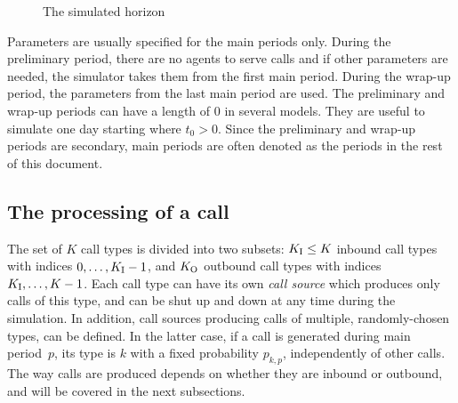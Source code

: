 \begin{figure}
\centering

\caption{The simulated horizon}
\label{fig:periods}
\end{figure}

Parameters are usually specified for the main periods only.  During
the preliminary
period, there are no agents to serve calls and if other parameters are
needed, the simulator takes them from the first main
period.  During the wrap-up period, the parameters from the last main
period are used.
The preliminary and wrap-up periods can have a length of 0
in several models.  They are useful to simulate one day starting where
$t_0>0$.  Since the preliminary and wrap-up periods are secondary,
main periods are often denoted as
the periods in the rest of this document.

\subsection{The processing of a call}

The set of $K$ call types is divided into two subsets:
$K_{\mathrm{I}}\le K$ inbound call types with indices $0, \ldots, K_{\mathrm{I}} - 1$,
and $K_{\mathrm{O}}$ outbound call types with indices $K_{\mathrm{I}}, \ldots, K - 1$.
Each call type can have its own \emph{call source} which produces
only calls of this type, and can be
shut up and down at any time during the simulation.
In addition, call sources producing calls of multiple, randomly-chosen
types, can be defined.
In the latter case, if a call is generated during main period~$p$,
its type is $k$ with a fixed probability
$p_{k,p}$,
independently of other calls.
The way calls are produced depends on whether they are inbound or
outbound, and will be covered in the next subsections.


